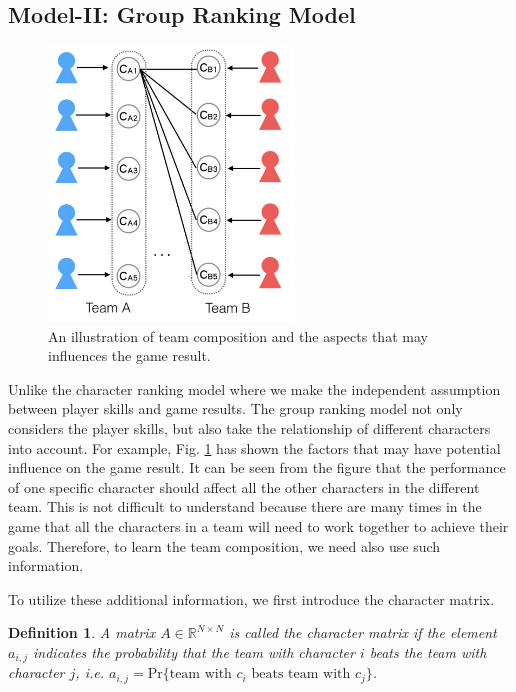 \documentclass[conference]{IEEEtran}
\newtheorem{definition}{Definition}
\begin{document}
\subsection{Model-II: Group Ranking Model}

\begin{figure}[t]
  \centering
    \includegraphics[width=65mm]{team_comp.pdf}
  \caption{An illustration of team composition and the aspects that may influences the game result.}
  \label{fig:team_comp}
\end{figure}

Unlike the character ranking model where we make the independent assumption between player skills and game results. The group ranking model not only considers the player skills, but also take the relationship of different characters into account. For example, Fig. \ref{fig:team_comp} has shown the factors that may have potential influence on the game result. It can be seen from the figure that the performance of one specific character should affect all the other characters in the different team. This is not difficult to understand because there are many times in the game that all the characters in a team will need to work together to achieve their goals. Therefore, to learn the team composition, we need also use such information.

To utilize these additional information, we first introduce the character matrix.
\begin{definition}
A matrix $A \in \mathbb{R}^{N\times N}$ is called the character matrix if the element $a_{i,j}$ indicates the probability that the team with character $i$ beats the team with character $j$, i.e. $a_{i,j}=\text{Pr}\{\text{team with $c_i$ beats team with $c_j$}\}$.
\end{definition}
\end{document}
